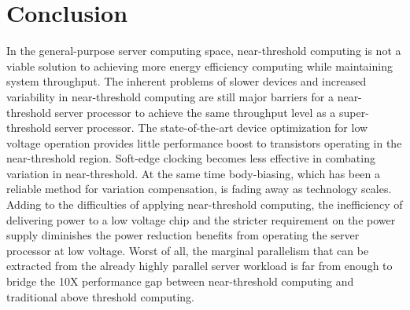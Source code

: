 \section{Conclusion}
\label{sec:conclusion}

In the general-purpose server computing space, near-threshold computing is not a viable solution to achieving more energy efficiency computing while maintaining system throughput.
The inherent problems of slower devices and increased variability in near-threshold computing are still major barriers for a near-threshold server processor to achieve the same throughput level as a super-threshold server processor.
The state-of-the-art device optimization for low voltage operation provides little performance boost to transistors operating in the near-threshold region.
Soft-edge clocking becomes less effective in combating variation in near-threshold.
At the same time body-biasing, which has been a reliable method for variation compensation, is fading away as technology scales.
Adding to the difficulties of applying near-threshold computing, the inefficiency of delivering power to a low voltage chip and the stricter requirement on the power supply diminishes the power reduction benefits from operating the server processor at low voltage.
Worst of all, the marginal parallelism that can be extracted from the already highly parallel server workload is far from enough to bridge the 10X performance gap between near-threshold computing and traditional above threshold computing.
